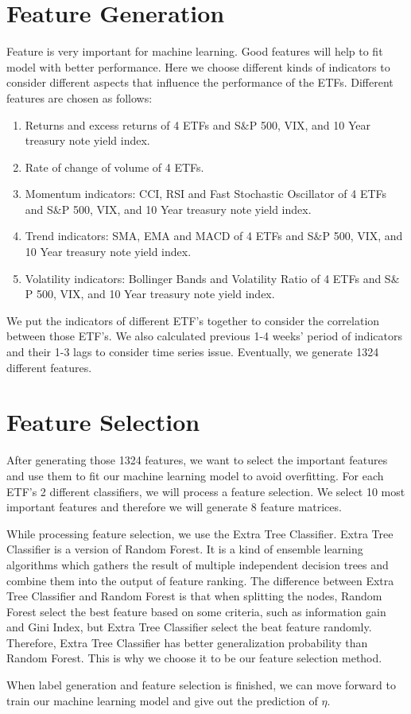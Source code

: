 \documentclass{article}
\begin{document}
\section{Feature Generation}

Feature is very important for machine learning. Good features will help to fit model with better performance. Here we choose different kinds of indicators to consider different aspects that influence the performance of the ETFs. Different features are chosen as follows:

\begin{enumerate}[$\bullet$]

\item Returns and excess returns of 4 ETFs and S$\&$P 500, VIX, and 10 Year treasury note yield index.

\item Rate of change of volume of 4 ETFs.

\item Momentum indicators: CCI, RSI and Fast Stochastic Oscillator of 4 ETFs and S$\&$P 500, VIX, and 10 Year treasury note yield index.

\item Trend indicators: SMA, EMA and MACD of 4 ETFs and S$\&$P 500, VIX, and 10 Year treasury note yield index.

\item Volatility indicators: Bollinger Bands and Volatility Ratio of 4 ETFs and S$\&$P 500, VIX, and 10 Year treasury note yield index.

\end{enumerate}

We put the indicators of different ETF's together to consider the correlation between those ETF's. We also calculated previous 1-4 weeks' period of indicators and their 1-3 lags to consider time series issue. Eventually, we generate 1324 different features.

\section{Feature Selection}

After generating those 1324 features, we want to select the important features and use them to fit our machine learning model to avoid overfitting. For each ETF's 2 different classifiers, we will process a feature selection. We select 10 most important features and therefore we will generate 8 feature matrices.

While processing feature selection, we use the Extra Tree Classifier. Extra Tree Classifier is a version of Random Forest. It is a kind of ensemble learning algorithms which gathers the result of multiple independent decision trees and combine them into the output of feature ranking. The difference between Extra Tree Classifier and Random Forest is that when splitting the nodes, Random Forest select the best feature based on some criteria, such as information gain and Gini Index, but Extra Tree Classifier select the beat feature randomly. Therefore, Extra Tree Classifier has better generalization probability than Random Forest. This is why we choose it to be our feature selection method.

When label generation and feature selection is finished, we can move forward to train our machine learning model and give out the prediction of $\eta$.
\end{document}
